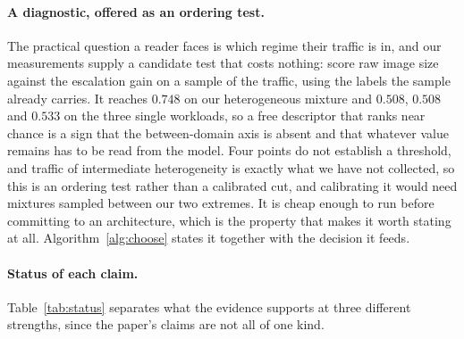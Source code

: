 \documentclass[10pt,twocolumn]{article}
\theoremstyle{plain}
\begin{document}
\paragraph{A diagnostic, offered as an ordering test.} The practical question a
reader faces is which regime their traffic is in, and our measurements supply a
candidate test that costs nothing: score raw image size against the escalation
gain on a sample of the traffic, using the labels the sample already carries.
It reaches $0.748$ on our heterogeneous mixture and $0.508$, $0.508$ and
$0.533$ on the three single workloads, so a free descriptor that ranks near
chance is a sign that the between-domain axis is absent and that whatever value
remains has to be read from the model. Four points do not establish a
threshold, and traffic of intermediate heterogeneity is exactly what we have
not collected, so this is an ordering test rather than a calibrated cut, and
calibrating it would need mixtures sampled between our two extremes. It is
cheap enough to
run before committing to an architecture, which is the property that makes it
worth stating at all. Algorithm~\ref{alg:choose} states it together with the
decision it feeds.

\paragraph{Status of each claim.} Table~\ref{tab:status} separates what the
evidence supports at three different strengths, since the paper's claims are
not all of one kind.
\end{document}
